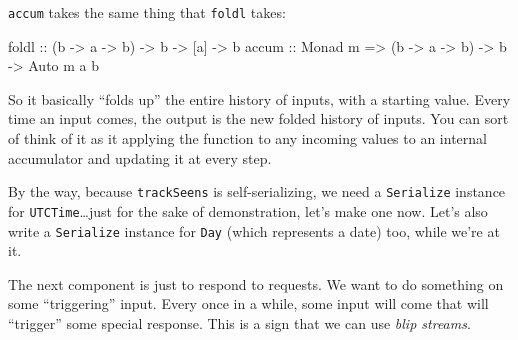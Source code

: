 \documentclass[]{article}
\newenvironment{Shaded}{}{}
\newcommand{\KeywordTok}[1]{\textcolor[rgb]{0.00,0.44,0.13}{\textbf{{#1}}}}
\newcommand{\DataTypeTok}[1]{\textcolor[rgb]{0.56,0.13,0.00}{{#1}}}
\newcommand{\CommentTok}[1]{\textcolor[rgb]{0.38,0.63,0.69}{\textit{{#1}}}}
\newcommand{\OtherTok}[1]{\textcolor[rgb]{0.00,0.44,0.13}{{#1}}}
\newcommand{\FunctionTok}[1]{\textcolor[rgb]{0.02,0.16,0.49}{{#1}}}
\newcommand{\NormalTok}[1]{{#1}}
\begin{document}
\texttt{accum} takes the same thing that \texttt{foldl} takes:

\begin{Shaded}
\begin{Highlighting}[]
\NormalTok{foldl}\OtherTok{ ::}            \NormalTok{(b }\OtherTok{->} \NormalTok{a }\OtherTok{->} \NormalTok{b) }\OtherTok{->} \NormalTok{b }\OtherTok{->} \NormalTok{[a] }\OtherTok{->} \NormalTok{b}
\OtherTok{accum ::} \DataTypeTok{Monad} \NormalTok{m }\OtherTok{=>} \NormalTok{(b }\OtherTok{->} \NormalTok{a }\OtherTok{->} \NormalTok{b) }\OtherTok{->} \NormalTok{b }\OtherTok{->} \DataTypeTok{Auto} \NormalTok{m a b}
\end{Highlighting}
\end{Shaded}

So it basically ``folds up'' the entire history of inputs, with a starting
value. Every time an input comes, the output is the new folded history of
inputs. You can sort of think of it as it applying the function to any incoming
values to an internal accumulator and updating it at every step.

By the way, because \texttt{trackSeens} is self-serializing, we need a
\texttt{Serialize} instance for \texttt{UTCTime}\ldots{}just for the sake of
demonstration, let's make one now. Let's also write a \texttt{Serialize}
instance for \texttt{Day} (which represents a date) too, while we're at it.

\begin{Shaded}
\end{Shaded}

The next component is just to respond to requests. We want to do something on
some ``triggering'' input. Every once in a while, some input will come that will
``trigger'' some special response. This is a sign that we can use \emph{blip
streams}.
\end{document}
